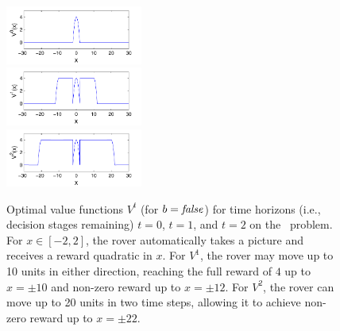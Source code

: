 \begin{figure}[t!]
\centering
\includegraphics[width=0.4\textwidth]{Figures1/v1_mr.pdf}\\
\includegraphics[width=0.4\textwidth]{Figures1/v2_mr.pdf}\\
\includegraphics[width=0.4\textwidth]{Figures1/v3_mr.pdf}
\vspace{-2mm}
\caption{\footnotesize Optimal value functions $V^t$ (for $b =
\mathit{false}$) for time horizons (i.e., decision stages remaining) $t=0$,
$t=1$, and $t=2$ on the \MarsRover\ problem.  For $x \in [-2,2]$, the
rover automatically takes a picture and receives a reward quadratic in
$x$.  For $V^1$, the rover may move up to 10 units in
either direction, reaching the full reward of $4$ up
to $x = \pm 10$ and non-zero reward up to $x = \pm 12$. 
For $V^2$, the rover can move up to 20 units in two time steps,
allowing it to achieve non-zero reward up to $x = \pm 22$.}
\label{fig:opt_graph}
\end{figure}

